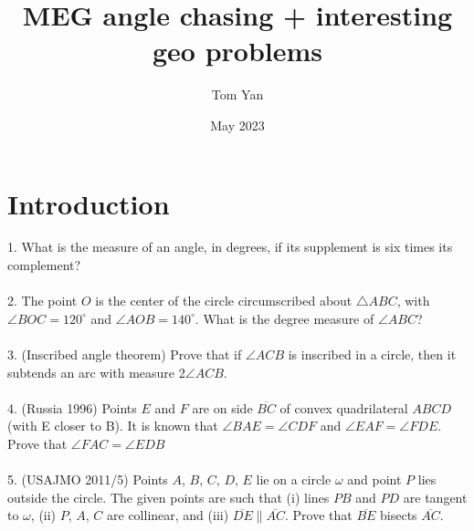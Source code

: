 \documentclass{article}
\title{MEG angle chasing + interesting geo problems}
\author{Tom Yan}
\date{May 2023}
\begin{document}
\maketitle

\section{Introduction}
1. What is the measure of an angle, in degrees, if its supplement is six times its complement? \\\\
2. The point $O$ is the center of the circle circumscribed about $\triangle ABC$, with $\angle BOC = 120^{\circ}$ and $\angle AOB = 140^{\circ}$. What is the degree measure of $\angle ABC$?\\\\
3. (Inscribed angle theorem) Prove that if $\angle ACB$ is inscribed in a circle, then it subtends an arc with measure 2$\angle ACB$. \\\\
4. (Russia 1996) Points $E$ and $F$ are on side $\overline{BC}$ of convex quadrilateral $ABCD$ (with E closer to B). It is known that $\angle BAE = \angle CDF $ and $\angle EAF = \angle FDE $. Prove that $\angle FAC = \angle EDB$ \\\\
5. (USAJMO 2011/5) Points $A$, $B$, $C$, $D$, $E$ lie on a circle $\omega$ and point $P$ lies outside the circle. The given points are such that (i) lines $PB$ and $PD$ are tangent to $\omega$, (ii) $P$, $A$, $C$ are collinear, and (iii) $\overline{DE} \parallel \overline{AC}$. Prove that $\overline{BE}$ bisects $\overline{AC}$.
\end{document}

